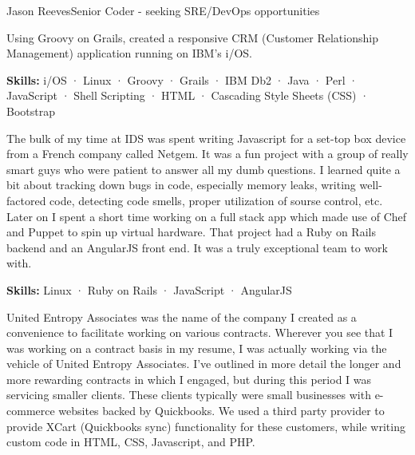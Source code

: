 \documentclass{article}
\begin{document}
\begin{cv}[avatar]{Jason Reeves}{Senior Coder - seeking SRE/DevOps opportunities}
\begin{cvevent}[Jul 2013][Sep 2016]
  Using Groovy on Grails, created a responsive CRM (Customer Relationship Management) application running on IBM's i/OS.
  
  \vspace*{3mm}
  \textbf{Skills:} i/OS · Linux · Groovy · Grails · IBM Db2 · Java · Perl · JavaScript · Shell Scripting · HTML · Cascading Style Sheets (CSS) · Bootstrap
  \vspace*{5mm}
\end{cvevent}

\begin{cvevent}[Jul 2011][Oct 2015]
  The bulk of my time at IDS was spent writing Javascript for a set-top box device from a French company called Netgem. It was a fun project with a group of really smart guys who were patient to answer all my dumb questions. I learned quite a bit about tracking down bugs in code, especially memory leaks, writing well-factored code, detecting code smells, proper utilization of sourse control, etc. Later on I spent a short time working on a full stack app which made use of Chef and Puppet to spin up virtual hardware. That project had a Ruby on Rails backend and an AngularJS front end. It was a truly exceptional team to work with.  
  
  \vspace*{3mm}
  \textbf{Skills:} Linux · Ruby on Rails · JavaScript · AngularJS
  \vspace*{5mm}
\end{cvevent}

\begin{cvevent}[Feb 2009][Jul 2011]
  United Entropy Associates was the name of the company I created as a convenience to facilitate working on various contracts. Wherever you see that I was working on a contract basis in my resume, I was actually working via the vehicle of United Entropy Associates. I've outlined in more detail the longer and more rewarding contracts in which I engaged, but during this period I was servicing smaller clients. These clients typically were small businesses with e-commerce websites backed by Quickbooks. We used a third party provider to provide XCart (Quickbooks sync) functionality for these customers, while writing custom code in HTML, CSS, Javascript, and PHP.
  

\end{cvevent}
\end{cv}
\end{document}
